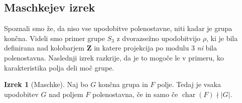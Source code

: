 \documentclass[11pt]{book}
\def\ZZ{\mathbf{Z}}
\DeclareMathOperator\characteristic{char}
\theoremstyle{definition}
\theoremstyle{zgled}
\theoremstyle{odprtproblem}
\theoremstyle{domacanaloga}
\theoremstyle{izrek}
\newtheorem*{izrek}{Izrek}
\begin{document}
\subsection{Maschkejev izrek}

Spoznali smo že, da niso vse upodobitve polenostavne, niti kadar je grupa končna. Videli smo primer grupe $S_3$ z dvorazsežno upodobitvijo $\rho$, ki je bila definirana nad kolobarjem $\ZZ$ in katere projekcija po modulu $3$ \emph{ni} bila polenostavna. Naslednji izrek razkrije, da je to mogoče le v primeru, ko karakteristika polja deli moč grupe.

\begin{izrek}[Maschke]
Naj bo $G$ končna grupa in $F$ polje. Tedaj je vsaka upodobitev $G$ nad poljem $F$ polenostavna, če in samo če $\characteristic(F) \nmid |G|$.
\end{izrek}
\end{document}
